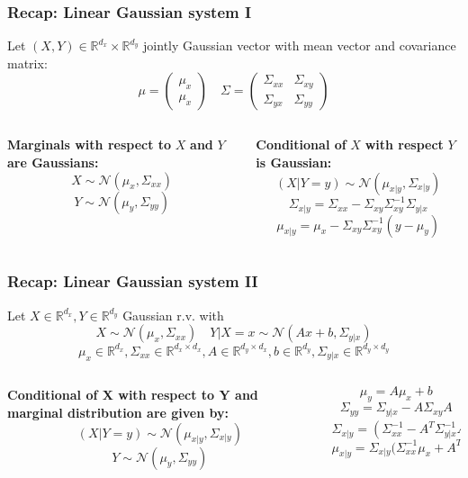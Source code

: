 \documentclass[xcolor=dvipsnames, compress]{beamer}
\newcommand{\R}{\ensuremath{\mathbb{R}}}
\begin{document}
\begin{frame}
\frametitle{Recap: Linear Gaussian system I}
Let $(X,Y) \in \R^{d_x} \times \R^{d_y}$ jointly Gaussian vector with mean vector and covariance matrix: $$ \mu = \left(\begin{matrix}\mu_x\\\mu_x\end{matrix}\right) \quad \Sigma = \left(\begin{matrix}\Sigma_{xx} & \Sigma_{xy} \\ \Sigma_{yx} & \Sigma_{yy} \end{matrix}\right)  $$
\begin{columns}
	\begin{column}{0.5\textwidth}
		\textbf{Marginals with respect to }$X$ \textbf{and} $Y$ \textbf{are Gaussians:}
		$$X \sim  \mathcal{N}(\mu_x, \Sigma_{xx}) $$
		$$Y \sim  \mathcal{N}(\mu_y, \Sigma_{yy})$$
		
	\end{column}
	\begin{column}{0.5\textwidth}  %
		\textbf{Conditional of }$X$ \textbf{with respect } $Y$ \textbf{is Gaussian:}
		$$(X|Y = y) \sim  \mathcal{N}(\mu_{x|y}, \Sigma_{x|y})$$
		$$ \Sigma_{x|y} = \Sigma_{xx} - \Sigma_{xy} \Sigma_{xy}^{-1} \Sigma_{y|x}$$
		$$ \mu_{x|y} = \mu_{x} - \Sigma_{xy} \Sigma_{xy}^{-1} (y-\mu_y)$$
	\end{column}
\end{columns}
\end{frame}

\begin{frame}
\frametitle{Recap: Linear Gaussian system II}
Let $X \in \R^{d_x}, Y \in \R^{d_y}$ Gaussian r.v. with $$ X \sim \mathcal{N}(\mu_x, \Sigma_{xx})  \quad  Y|X=x \sim \mathcal{N}(Ax+b, \Sigma_{y|x})  $$
$$\mu_x \in \R^{d_x}, \Sigma_{xx} \in \R^{d_x \times d_x}, A \in \R^{d_y \times d_x}, b \in \R^{d_y},  \Sigma_{y|x} \in \R^{d_y \times d_y}$$
\begin{columns}
	\begin{column}{0.5\textwidth}
		\textbf{Conditional of X with respect to Y and marginal distribution are given by:}
		$$(X|Y=y) \sim  \mathcal{N}(\mu_{x|y}, \Sigma_{x|y}) $$
		$$Y \sim  \mathcal{N}(\mu_y, \Sigma_{yy})$$
		
	\end{column}
	\begin{column}{0.5\textwidth}  %
		$$\mu_y = A \mu_x + b$$
		$$ \Sigma_{yy} = \Sigma_{y|x} - A \Sigma_{xy}A$$
		$$ \Sigma_{x|y} = (\Sigma_{xx}^{-1} - A^T \Sigma_{y|x}^{-1}A)^{-1}$$
		$$ \mu_{x|y} = \Sigma_{x|y} (\Sigma_{xx}^{-1} \mu_x + A^T \Sigma_{y|x}^{-1} (y-b)$$
	\end{column}
\end{columns}
\end{frame}
\end{document}
